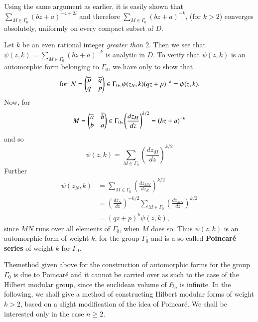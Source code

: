 Using the same argument as earlier, it is easily shown that
$\sum\limits_{M\in\Gamma_{0}}(bz+a)^{-4+2l}$ and therefore
$\sum\limits_{M\in\Gamma_{0}}(bz+a)^{-k}$, (for $k>2$) converges
absolutely, uniformly on every compact subset of $D$.

Let $k$ be an even rational integer {\em greater than } 2. Then we see
that $\psi(z,k)=\sum\limits_{M\in\Gamma_{0}}(bz+a)^{-k}$ is analytic
in $D$. To verify that $\psi(z,k)$ is an automorphic form belonging to
$\Gamma_{0}$, we have only to show that
$$
\text{for \ } N=
\begin{pmatrix}
\overline{p} & \overline{q}\\
q & p
\end{pmatrix}
\in\Gamma_{0},\psi(z_{N},k)(qz+p)^{-k}=\psi(z,k).
$$
Now, for
$$
M=
\begin{pmatrix}
\overline{a} & \overline{b}\\
b & a
\end{pmatrix}
\in \Gamma_{0}, \left(\frac{dz_{M}}{dz}\right)^{k/2}=(bz+a)^{-k}
$$
and so 
$$
\psi(z,k)=\sum_{M\in\Gamma_{0}}\left(\frac{dz_{M}}{dz}\right)^{k/2}
$$
Further
\begin{align*}
\psi(z_{N},k) &=
\sum_{M\in\Gamma_{0}}\left(\frac{dz_{MN}}{dz_{N}}\right)^{k/2}\\
&=
\left(\frac{dz_{N}}{dz}\right)^{-k/2}\sum_{M\in\Gamma_{0}}\left(\frac{dz_{MN}}{dz}\right)^{k/2}\\
&= (qz+p)^{k}\psi(z,k),
\end{align*}
since $MN$ runs over all elements of $\Gamma_{0}$, when $M$ does
so. Thus $\psi(z,k)$ is an automorphic form of weight $k$, for the
group $\Gamma_{0}$ and is a so-called {\bf Poincar\'e series} of
weight $k$ for $\Gamma_{0}$.

The\pageoriginale method given above for the construction of
automorphic forms for the group $\Gamma_{0}$ is due to Poincar\'e and
it cannot be carried over as such to the case of the Hilbert modular
group, since the euclidean volume of $\mathfrak{H}_{n}$ is
infinite. In the following, we shall give a method of constructing
Hilbert modular forms of weight $k>2$, based on a slight modification
of the idea of Poincar\'e. We shall be interested only in the case
$n\geq 2$.

